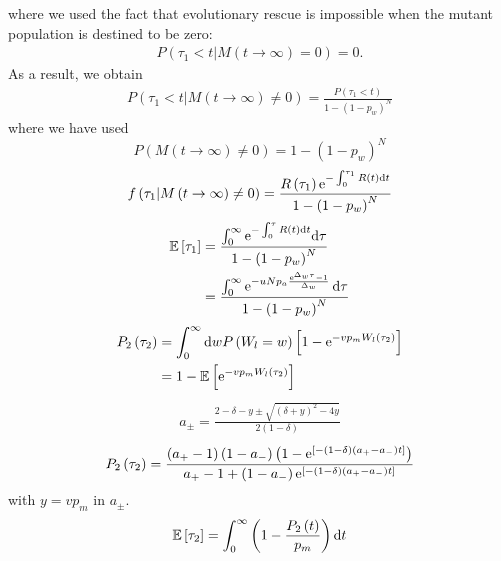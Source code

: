 \documentclass[12pt]{extarticle}
\renewcommand{\d}{{\rm d}}
\newcommand{\e}{{\rm e}}
\begin{document}
where we used the fact that evolutionary rescue is impossible when the mutant population is destined to be zero:
\begin{align*}
P\left(\tau_1<t|M\left(t\rightarrow\infty\right)=0\right)=0.
\end{align*}
As a result, we obtain 
\begin{align}
P\left(\tau_1<t|M\left(t\rightarrow\infty\right)\neq0\right)=\frac{P\left(\tau_1<t\right)}{1-\left(1-p_w\right)^N}
\end{align}
where we have used
\begin{equation}
P\left(M\left(t\rightarrow\infty\right)\neq0\right)=1-\left(1-p_w\right)^N
\end{equation}
\begin{align}
f\left(\tau_1|M\left(t\rightarrow\infty\right)\neq0\right)=\frac{R\left(\tau_1\right)\e^{-\int_0^{\tau_1} R(t)\d t}}{1-\left(1-p_w\right)^N}
\end{align}
\begin{align}
\mathbb{E}\left[\tau_1\right]&=\frac{\int_0^\infty\e^{-\int_0^\tau R(t)\d t}\d\tau}{1-\left(1-p_w\right)^N}\\
&=\frac{\int_0^\infty\e^{-uNp_a\frac{\e^{\Delta_w\tau}-1}{\Delta_w}}\,\d\tau}{1-\left(1-p_w\right)^N}
\end{align}
\begin{align}
P_2\left(\tau_2\right)&=\int_0^\infty \d w P\left(W_l=w\right)\left[1-\e^{-vp_mW_l\left(\tau_2\right)}\right]\\
&=1-\mathbb{E}\left[\e^{-vp_mW_l\left(\tau_2\right)}\right]
\end{align}
\begin{align}
a_\pm=\frac{2-\delta-y\pm\sqrt{\left(\delta+y\right)^2-4y}}{2\left(1-\delta\right)}
\end{align}
\begin{align}
P_2\left(\tau_2\right)=\frac{\left(a_+-1\right)\left(1-a_-\right)\left(1-\e^{\left[-\left(1-\delta\right)\left(a_+-a_-\right)t\right]}\right)}{a_+-1+\left(1-a_-\right)\e^{\left[-\left(1-\delta\right)\left(a_+-a_-\right)t\right]}}
\end{align}
with $y=vp_m$ in $a_\pm$.
\begin{align}
\mathbb{E}\left[\tau_2\right]=\int_0^\infty\left(1-\frac{P_2\left(t\right)}{p_m}\right)\d t
\end{align}
\end{document}
